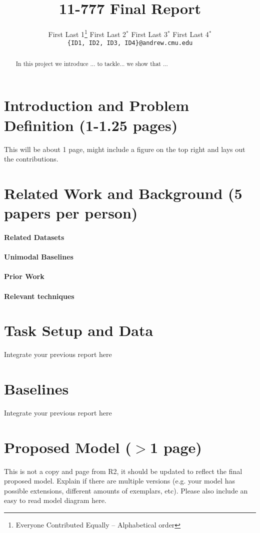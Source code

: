 \documentclass[11pt,a4paper]{article}
\title{11-777 Final Report}
\author{
  First Last 1\thanks{\hspace{4pt}Everyone Contributed Equally -- Alphabetical order} \hspace{2em} First Last 2$^*$ \hspace{2em} First Last 3$^*$ \hspace{2em} First Last 4$^*$ \\
  \texttt{\{ID1, ID2, ID3, ID4\}@andrew.cmu.edu}
  }
\date{}
\begin{document}
\maketitle
\begin{abstract}
In this project we introduce ... to tackle... we show that ...
\end{abstract}

\section{Introduction and Problem Definition (1-1.25 pages)}
This will be about 1 page, might include a figure on the top right and lays out the contributions.

\clearpage
\section{Related Work and Background (5 papers per person)}
\paragraph{Related Datasets} 

\paragraph{Unimodal Baselines}

\paragraph{Prior Work}

\paragraph{Relevant techniques}


\clearpage
\section{Task Setup and Data}
Integrate your previous report here

\clearpage
\section{Baselines}
Integrate your previous report here

\clearpage
\section{Proposed Model ($>$1 page)}
This is not a copy and page from R2, it should be updated to reflect the final proposed model. Explain if there are multiple versions (e.g. your model has possible extensions, different amounts of exemplars, etc).  Please also include an easy to read model diagram here.
\end{document}
